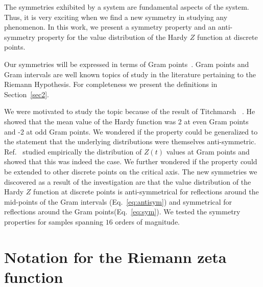 \documentclass[twoside]{article}
\begin{document}
The symmetries exhibited by a system are fundamental aspects of the system. Thus, it is very exciting when we find a new symmetry in studying any phenomenon. In this work, we present a symmetry property and an anti-symmetry property for the value
distribution of the Hardy $Z$ function at discrete points.

Our symmetries will be expressed in terms of Gram points~\cite{Gram 1903}. Gram points and  Gram intervals are well known topics of study in the literature pertaining to the Riemann Hypothesis. For completeness we present the definitions in Section~\ref{sec2}.


We were motivated to study the topic because of the result of Titchmarsh~\cite{Titchmarsh 1934} . He showed that the mean value of the Hardy function was 2 at even Gram points and -2 at odd Gram points. We wondered if the property could be generalized to the statement that the underlying distributions were themselves anti-symmetric. Ref.~\cite{Shanker 2018a} studied empirically the distribution of $Z(t)$ values at Gram points and showed  that this was indeed the case. We further wondered if  the property could be extended to other discrete points on the critical axis. The new symmetries we discovered as a result of the investigation  are that the  value
distribution of the Hardy $Z$ function at discrete points is anti-symmetrical for reflections around the mid-points of the Gram intervals (Eq.~\ref{eq:antisym}) and symmetrical for reflections around the Gram points(Eq.~\ref{eq:sym}). We tested the symmetry properties for samples spanning $16$ orders of magnitude.



\section{\label{sec2}Notation for the Riemann zeta function}
\end{document}

